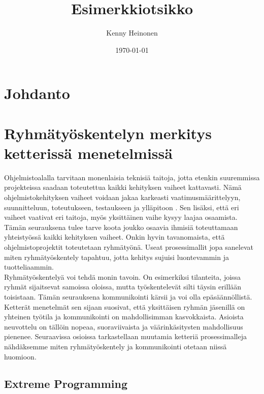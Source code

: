 \documentclass[finnish]{../tktltiki2}
\title{Esimerkkiotsikko}
\author{Kenny Heinonen}
\date{\today}
\theoremstyle{definition}
\theoremstyle{remark}
\begin{document}

\maketitle        %

\tableofcontents  %
\newpage          %



\section{Johdanto}

\section{Ryhmätyöskentelyn merkitys ketterissä menetelmissä}


Ohjelmistoalalla tarvitaan monenlaisia teknisiä taitoja, jotta etenkin suuremmissa projekteissa saadaan toteutettua kaikki kehityksen vaiheet kattavasti. Nämä ohjelmistokehityksen vaiheet voidaan jakaa karkeasti vaatimusmäärittelyyn, suunnitteluun, toteutukseen, testaukseen ja ylläpitoon \cite{Capretz:2010:MSS:1726559.1726574}. Sen lisäksi, että eri vaiheet vaativat eri taitoja, myös yksittäinen vaihe kysyy laajaa osaamista. Tämän seurauksena tulee tarve koota joukko osaavia ihmisiä toteuttamaan yhteistyössä kaikki kehityksen vaiheet. Onkin hyvin tavanomaista, että ohjelmistoprojektit toteutetaan ryhmätyönä. Useat prosessimallit jopa sanelevat miten ryhmätyöskentely tapahtuu, jotta kehitys sujuisi luontevammin ja tuotteliaammin.\\

Ryhmätyöskentelyä voi tehdä monin tavoin. On esimerkiksi tilanteita, joissa ryhmät sijaitsevat samoissa oloissa, mutta työskentelevät silti täysin erillään toisistaan. Tämän seurauksena kommunikointi kärsii ja voi olla epäsäännöllistä. Ketterät menetelmät sen sijaan suosivat, että yksittäisen ryhmän jäsenillä on yhteinen työtila ja kommunikointi on mahdollisimman kasvokkaista. Asioista neuvottelu on tällöin nopeaa, suoraviivaista ja väärinkäsitysten mahdollisuus pienenee. Seuraavissa osioissa tarkastellaan muutamia ketteriä prosessimalleja nähdäksemme miten ryhmätyöskentely ja kommunikointi otetaan niissä huomioon.

\subsection{Extreme Programming}
\end{document}
